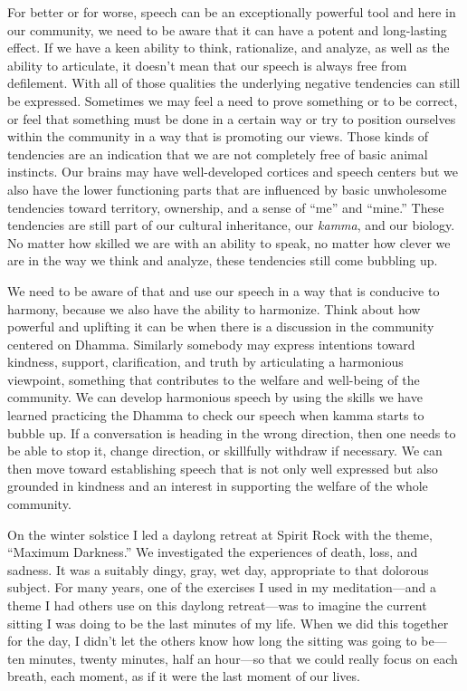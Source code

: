 For better or for worse, speech can be an exceptionally powerful tool 
and here in our community, we need to be aware that it can have a 
potent and long-lasting effect. If we have a keen ability to think, 
rationalize, and analyze, as well as the ability to articulate, it 
doesn't mean that our speech is always free from defilement. With all 
of those qualities the underlying negative tendencies can still be 
expressed. Sometimes we may feel a need to prove something or to be 
correct, or feel that something must be done in a certain way or try to 
position ourselves within the community in a way that is promoting our 
views. Those kinds of tendencies are an indication that we are not 
completely free of basic animal instincts. Our brains may have 
well-developed cortices and speech centers but we also have the lower 
functioning parts that are influenced by basic unwholesome tendencies 
toward territory, ownership, and a sense of ``me'' and ``mine.'' These 
tendencies are still part of our cultural inheritance, our 
\emph{kamma}, and our biology. No matter how skilled we are with an 
ability to speak, no matter how clever we are in the way we think and 
analyze, these tendencies still come bubbling up.

We need to be aware of that and use our speech in a way that is 
conducive to harmony, because we also have the ability to harmonize. 
Think about how powerful and uplifting it can be when there is a 
discussion in the community centered on Dhamma. Similarly somebody may 
express intentions toward kindness, support, clarification, and truth 
by articulating a harmonious viewpoint, something that contributes to 
the welfare and well-being of the community. We can develop harmonious 
speech by using the skills we have learned practicing the Dhamma to 
check our speech when kamma starts to bubble up. If a conversation is 
heading in the wrong direction, then one needs to be able to stop it, 
change direction, or skillfully withdraw if necessary. We can then move 
toward establishing speech that is not only well expressed but also 
grounded in kindness and an interest in supporting the welfare of the 
whole community.


On the winter solstice I led a daylong retreat at Spirit Rock with the 
theme, ``Maximum Darkness.'' We investigated the experiences of death, 
loss, and sadness. It was a suitably dingy, gray, wet day, appropriate 
to that dolorous subject. For many years, one of the exercises I used 
in my meditation---and a theme I had others use on this daylong 
retreat---was to imagine the current sitting I was doing to be the last 
minutes of my life. When we did this together for the day, I didn't let 
the others know how long the sitting was going to be---ten minutes, 
twenty minutes, half an hour---so that we could really focus on each 
breath, each moment, as if it were the last moment of our lives.

